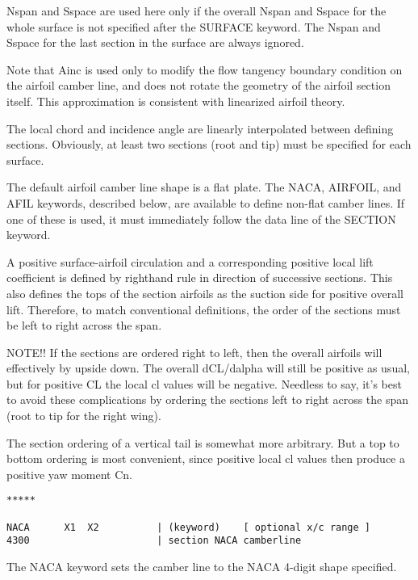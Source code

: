 Nspan and Sspace are used here only if the overall Nspan and Sspace 
for the whole surface is not specified after the SURFACE keyword.
The Nspan and Sspace for the last section in the surface are always ignored.

Note that Ainc is used only to modify the flow tangency boundary 
condition on the airfoil camber line, and does not rotate the geometry 
of the airfoil section itself.  This approximation is consistent with 
linearized airfoil theory.

The local chord and incidence angle are linearly interpolated between
defining sections.  Obviously, at least two sections (root and tip)
must be specified for each surface.

The default airfoil camber line shape is a flat plate.  The NACA, AIRFOIL,
and AFIL keywords, described below, are available to define non-flat
camber lines.  If one of these is used, it must immediately follow 
the data line of the SECTION keyword.

A positive surface-airfoil circulation and a corresponding positive local 
lift coefficient is defined by righthand rule in direction of successive
sections. This also defines the tops of the section airfoils as the suction
side for positive overall lift.  Therefore, to match conventional definitions, 
the order of the sections must be left to right across the span.  

NOTE!!
If the sections are ordered right to left, then the overall airfoils will effectively
by upside down.  The overall dCL/dalpha will still be positive as usual, but 
for positive CL the local cl values will be negative.  Needless to say,
it's best to avoid these complications by ordering the sections left to right
across the span (root to tip for the right wing).  

The section ordering of a vertical tail is somewhat more arbitrary.  
But a top to bottom ordering is most convenient, since positive local cl values 
then produce a positive yaw moment Cn.\\

\begin{lstlisting}
*****

NACA      X1  X2          | (keyword)    [ optional x/c range ]
4300                      | section NACA camberline

\end{lstlisting}

The NACA keyword sets the camber line to the NACA 4-digit shape specified.


